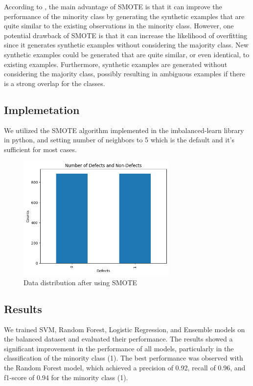 \documentclass[12pt]{report}
\begin{document}
According to \cite{fernandez2018smote}, the main advantage of SMOTE is that it
can improve the performance of the minority class by generating the synthetic
examples that are quite similar to the existing observations in the minority
class. However, one potential drawback of SMOTE is that it can increase the
likelihood of overfitting since it generates synthetic examples without
considering the majority class. New synthetic examples could be generated that
are quite similar, or even identical, to existing examples. Furthermore,
synthetic examples are generated without considering the majority class,
possibly resulting in ambiguous examples if there is a strong overlap for the
classes.

\subsection*{Implemetation}
We utilized the SMOTE algorithm implemented in the imbalanced-learn library in
python, and setting number of neighbors to 5 which is the default and it's
sufficient for most cases.

\begin{figure}[ht]
    \centering
    \includegraphics[width=0.7\textwidth]{./figures/balanced_data.png}
    \caption{Data distribution after using SMOTE}
    \label{fig:smote_plot}
\end{figure}

\subsection*{Results}
We trained SVM, Random Forest, Logistic Regression, and Ensemble models on the
balanced dataset and evaluated their performance. The results showed a
significant improvement in the performance of all models, particularly in the
classification of the minority class (1). The best performance was observed
with the Random Forest model, which achieved a precision of 0.92, recall of
0.96, and f1-score of 0.94 for the minority class (1).
\end{document}
